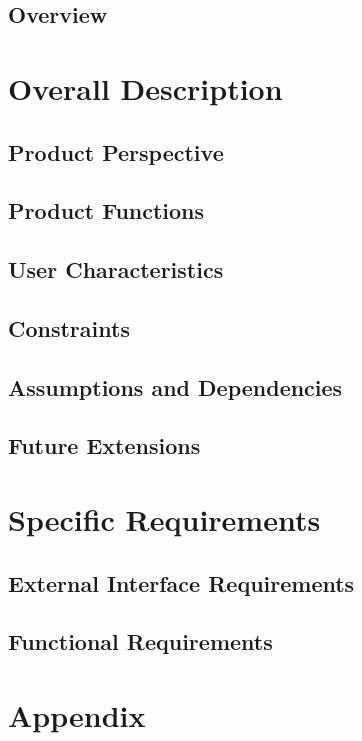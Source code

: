 \documentclass[a4paper,12pt]{report}
\begin{document}
\section{Overview}


\chapter{Overall Description}
\label{ch:Overall_Description}

\section{Product Perspective}


\section{Product Functions}


\section{User Characteristics}


\section{Constraints}


\section{Assumptions and Dependencies}


\section{Future Extensions}


\chapter{Specific Requirements}
\label{ch:Specific_Requirements}

\section{External Interface Requirements}


\section{Functional Requirements} \label{fun_req}


\appendix
\chapter{Appendix}



\end{document}
